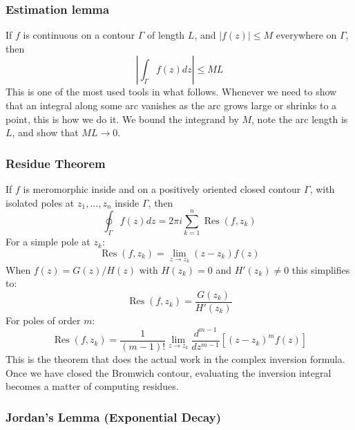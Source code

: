 \subsubsection{Estimation lemma}

If $f$ is continuous on a contour $\Gamma$ of length $L$, and $|f(z)|\leq M$ everywhere on $\Gamma$, then 
\begin{equation}\label{Eq3.1.7}
    \left|\int_{\Gamma}f(z)dz\right|\leq ML
\end{equation}
This is one of the most used tools in what follows. Whenever we need to show that an integral along some arc vanishes as the arc grows large or shrinks to a point, this is how we do it. We bound the integrand by $M$, note the arc length is $L$, and show that $ML\rightarrow0$. \cite{ahlfors1979,priestley2003}

\subsubsection*{Residue Theorem}

If $f$ is meromorphic inside and on a positively oriented closed contour $\Gamma$, with isolated poles at $z_{1},...,z_{n}$ inside $\Gamma$, then
\begin{equation}\label{Eq3.1.8}
    \oint_{\Gamma}f(z)dz= 2\pi i\sum^{n}_{k=1}\operatorname{Res}(f,z_{k})
\end{equation} For a simple pole at $z_{k}$: 
\begin{equation}\label{Eq3.1.9}
    \operatorname{Res}(f,z_{k})=\lim_{z\rightarrow z_{k}}(z-z_{k})f(z)
\end{equation} 
When $f(z)=G(z)/H(z)$ with $H(z_{k})=0$ and $H'(z_{k})\neq0$ this simplifies to: 
\begin{equation}\label{Eq3.1.10}
    \operatorname{Res}(f,z_{k})=\frac{G(z_{k})}{H'(z_{k})}
\end{equation}
For poles of order $m$: 
\begin{equation}\label{Eq3.1.11}
    \operatorname{Res}(f,z_{k})=\frac{1}{(m-1)!}\lim_{z\rightarrow z_{k}}\frac{d^{m-1}}{dz^{m-1}}[(z-z_{k})^{m}f(z)]
\end{equation}
This is the theorem that does the actual work in the complex inversion formula. Once we have closed the Bromwich contour, evaluating the inversion integral becomes a matter of computing residues. \cite{RedBook,YellowBook,WatsonLaplace,MethOfPhys,ThousandPage,TransformsTheory,ahlfors1979,priestley2003}

\subsubsection*{Jordan's Lemma (Exponential Decay)}

